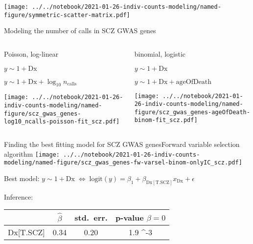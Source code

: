 \documentclass[usenames,dvipsnames]{beamer}
\begin{document}
\begin{frame}
\texttt{[image: ../../notebook/2021-01-26-indiv-counts-modeling/named-figure/symmetric-scatter-matrix.pdf]}
\end{frame}

\begin{frame}{Modeling the number of calls in SCZ GWAS genes}
\begin{columns}[t]
\begin{column}{0.5\textwidth}
\begin{center}
Poisson, log-linear
\begin{description}
\tiny
\item[M0] \(y \sim 1 + \mathrm{Dx}\)
\item[M1] \(y \sim 1 + \mathrm{Dx} + \log_{10} n_\mathrm{calls}\)
\end{description}
\end{center}
\texttt{[image: ../../notebook/2021-01-26-indiv-counts-modeling/named-figure/scz\_gwas\_genes-log10\_ncalls-poisson-fit\_scz.pdf]}
\end{column}

\begin{column}{0.5\textwidth}
\begin{center}
binomial, logistic
\begin{description}
\tiny
\item[M0] \(y \sim 1 + \mathrm{Dx}\)
\item[M1] \(y \sim 1 + \mathrm{Dx} + \mathrm{ageOfDeath}\)
\end{description}
\end{center}
\texttt{[image: ../../notebook/2021-01-26-indiv-counts-modeling/named-figure/scz\_gwas\_genes-ageOfDeath-binom-fit\_scz.pdf]}
\end{column}
\end{columns}
\begin{center}
\end{center}
\end{frame}

\begin{frame}{Finding the best fitting model for SCZ GWAS genes}{Forward variable selection algorithm}
\small
\texttt{[image: ../../notebook/2021-01-26-indiv-counts-modeling/named-figure/scz\_gwas\_genes-fw-varsel-binom-onlyIC\_scz.pdf]}
\begin{center}
Best model:
\(
	y \sim 1 + \mathrm{Dx} \; \Leftrightarrow \; \mathrm{logit}(y) = \beta_1 +
	\beta_\mathrm{Dx[T.SCZ]} x_\mathrm{Dx} + \epsilon
\)
\end{center}

\begin{center}
Inference:
\begin{tabular}{c|ccc}
& \(\hat{\beta}\) & std.~err. & p-value \(\beta = 0\) \\
\hline
Dx[T.SCZ] & 0.34 & 0.20 & 1.9 \times 10^{-3} \\
\end{tabular}
\end{center}
\end{frame}
\end{document}
